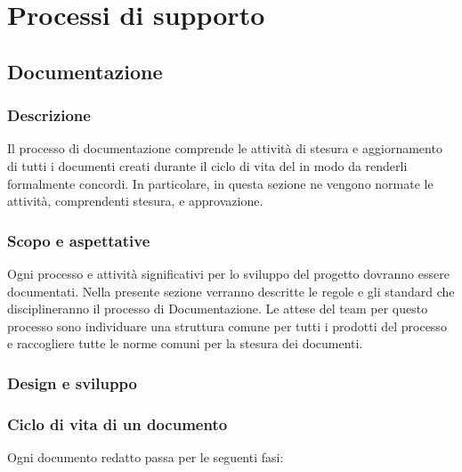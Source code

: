 \section{Processi di supporto}
\subsection{Documentazione}
\subsubsection{Descrizione}
Il processo di documentazione comprende le attività di stesura e aggiornamento di tutti i documenti creati durante il ciclo di vita del  in modo da renderli formalmente concordi. In particolare, in questa sezione ne vengono normate le attività, comprendenti stesura,  e approvazione. 
\subsubsection{Scopo e aspettative}
Ogni processo e attività significativi per lo sviluppo del progetto dovranno essere documentati. Nella presente sezione verranno descritte le regole e gli standard che disciplineranno il processo di Documentazione.
Le attese del team per questo processo sono individuare una struttura comune per tutti i prodotti del processo e raccogliere tutte le norme comuni per la stesura dei documenti.
\subsubsection{Design e sviluppo}
\subsubsection*{Ciclo di vita di un documento}
Ogni documento redatto passa per le seguenti fasi:

